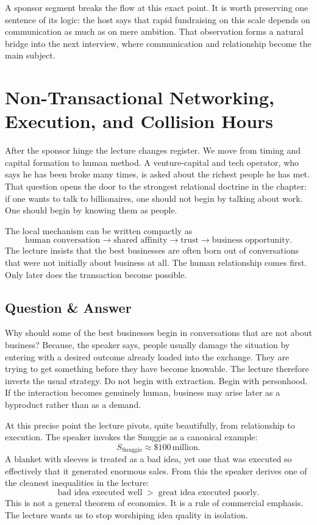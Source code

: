 A sponsor segment breaks the flow at this exact point. It is worth preserving one sentence of its logic: the host says that rapid fundraising on this scale depends on communication as much as on mere ambition. That observation forms a natural bridge into the next interview, where communication and relationship become the main subject.

\section{Non-Transactional Networking, Execution, and Collision Hours}

After the sponsor hinge the lecture changes register. We move from timing and capital formation to human method. A venture-capital and tech operator, who says he has been broke many times, is asked about the richest people he has met. That question opens the door to the strongest relational doctrine in the chapter: if one wants to talk to billionaires, one should not begin by talking about work. One should begin by knowing them as people.

The local mechanism can be written compactly as
\begin{equation}
\text{human conversation}
\to
\text{shared affinity}
\to
\text{trust}
\to
\text{business opportunity}.
\end{equation}
The lecture insists that the best businesses are often born out of conversations that were not initially about business at all. The human relationship comes first. Only later does the transaction become possible.

\subsection{Question \& Answer}

Why should some of the best businesses begin in conversations that are not about business? Because, the speaker says, people usually damage the situation by entering with a desired outcome already loaded into the exchange. They are trying to get something before they have become knowable. The lecture therefore inverts the usual strategy. Do not begin with extraction. Begin with personhood. If the interaction becomes genuinely human, business may arise later as a byproduct rather than as a demand.

At this precise point the lecture pivots, quite beautifully, from relationship to execution. The speaker invokes the Snuggie as a canonical example:
\begin{equation}
S_{\text{Snuggie}} \approx \$100\,\text{million}.
\end{equation}
A blanket with sleeves is treated as a bad idea, yet one that was executed so effectively that it generated enormous sales. From this the speaker derives one of the cleanest inequalities in the lecture:
\begin{equation}
\text{bad idea executed well}
\;>\;
\text{great idea executed poorly}.
\end{equation}
This is not a general theorem of economics. It is a rule of commercial emphasis. The lecture wants us to stop worshiping idea quality in isolation.

